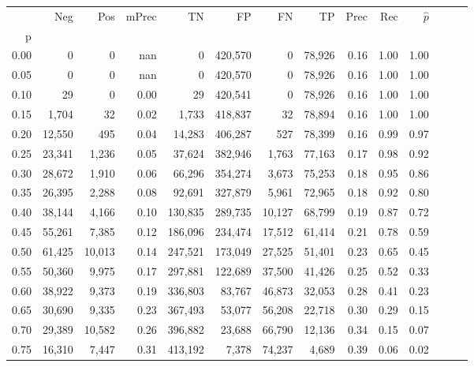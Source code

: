 \begin{tabular}{rrrrrrrrrrrrrr}
\toprule
{} &     Neg &     Pos & mPrec &       TN &       FP &      FN &      TP &  Prec &   Rec & $\hat{p}$ \\
p    &         &         &       &          &          &         &         &       &       &           \\
\midrule
0.00 &       0 &       0 &   nan &        0 &  420,570 &       0 &  78,926 &  0.16 &  1.00 &      1.00 \\
0.05 &       0 &       0 &   nan &        0 &  420,570 &       0 &  78,926 &  0.16 &  1.00 &      1.00 \\
0.10 &      29 &       0 &  0.00 &       29 &  420,541 &       0 &  78,926 &  0.16 &  1.00 &      1.00 \\
0.15 &   1,704 &      32 &  0.02 &    1,733 &  418,837 &      32 &  78,894 &  0.16 &  1.00 &      1.00 \\
0.20 &  12,550 &     495 &  0.04 &   14,283 &  406,287 &     527 &  78,399 &  0.16 &  0.99 &      0.97 \\
0.25 &  23,341 &   1,236 &  0.05 &   37,624 &  382,946 &   1,763 &  77,163 &  0.17 &  0.98 &      0.92 \\
0.30 &  28,672 &   1,910 &  0.06 &   66,296 &  354,274 &   3,673 &  75,253 &  0.18 &  0.95 &      0.86 \\
0.35 &  26,395 &   2,288 &  0.08 &   92,691 &  327,879 &   5,961 &  72,965 &  0.18 &  0.92 &      0.80 \\
0.40 &  38,144 &   4,166 &  0.10 &  130,835 &  289,735 &  10,127 &  68,799 &  0.19 &  0.87 &      0.72 \\
0.45 &  55,261 &   7,385 &  0.12 &  186,096 &  234,474 &  17,512 &  61,414 &  0.21 &  0.78 &      0.59 \\
0.50 &  61,425 &  10,013 &  0.14 &  247,521 &  173,049 &  27,525 &  51,401 &  0.23 &  0.65 &      0.45 \\
0.55 &  50,360 &   9,975 &  0.17 &  297,881 &  122,689 &  37,500 &  41,426 &  0.25 &  0.52 &      0.33 \\
0.60 &  38,922 &   9,373 &  0.19 &  336,803 &   83,767 &  46,873 &  32,053 &  0.28 &  0.41 &      0.23 \\
0.65 &  30,690 &   9,335 &  0.23 &  367,493 &   53,077 &  56,208 &  22,718 &  0.30 &  0.29 &      0.15 \\
0.70 &  29,389 &  10,582 &  0.26 &  396,882 &   23,688 &  66,790 &  12,136 &  0.34 &  0.15 &      0.07 \\
0.75 &  16,310 &   7,447 &  0.31 &  413,192 &    7,378 &  74,237 &   4,689 &  0.39 &  0.06 &      0.02 \\

\end{tabular}
